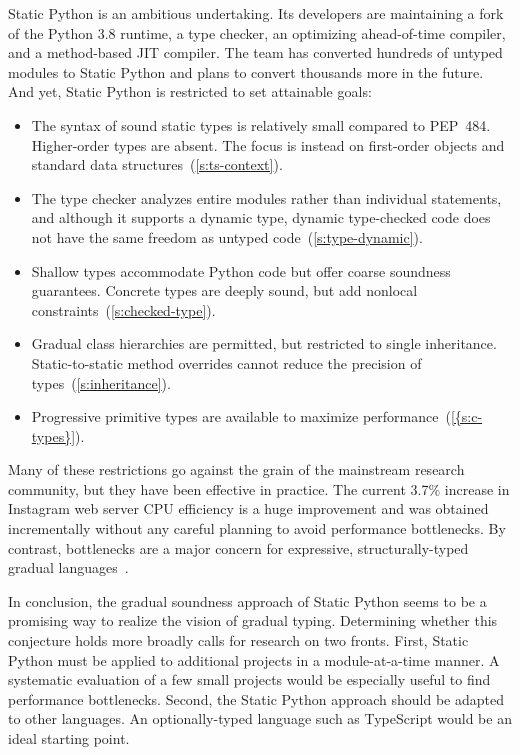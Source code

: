 \documentclass[english,cleveref,submission]{programming}
\newcommand{\SP}{Static Python}
\newcommand{\PEP}{PEP~484}
\newcommand{\CPUchange}{3.7\%}
\begin{document}
\SP{} is an ambitious undertaking.
Its developers are maintaining a fork of the Python 3.8 runtime,
a type checker,
an optimizing ahead-of-time compiler,
and a method-based JIT compiler.
The team has converted hundreds of untyped modules to \SP{}
and plans to convert thousands more in the future.
And yet, \SP{} is restricted to set attainable goals:
\begin{itemize}
  \item
    The syntax of sound static types is relatively small compared
    to \PEP{}.
    Higher-order types are absent.
    The focus is instead on first-order objects and standard data structures~(\cref{s:ts-context}).
  \item
    The type checker analyzes entire modules rather than individual statements,
    and although it supports a dynamic type, dynamic type-checked code
    does not have the same freedom as untyped code~(\cref{s:type-dynamic}).
  \item
    Shallow types accommodate Python code but offer coarse
    soundness guarantees.
    Concrete types are deeply sound, but add nonlocal constraints~(\cref{s:checked-type}).
  \item
    Gradual class hierarchies are permitted, but restricted to single inheritance.
    Static-to-static method overrides cannot reduce the precision of types~(\cref{s:inheritance}).
  \item
    Progressive primitive types are available to maximize performance~(\cref{{s:c-types}}).
\end{itemize}
%
Many of these restrictions go against the grain of the mainstream
research community, but they have been effective in practice.
The current \CPUchange{} increase in Instagram web server CPU efficiency is a huge improvement
and was obtained incrementally without any careful planning to avoid performance bottlenecks.
By contrast, bottlenecks are a major concern for expressive, structurally-typed
gradual languages~\cite{gtnffvf-jfp-2019,tfgnvf-popl-2016}.

In conclusion, the gradual soundness approach of \SP{} seems to be a promising
way to realize the vision of gradual typing.
Determining whether this conjecture holds more broadly
calls for research on two fronts.
First, \SP{} must be applied to additional projects in a module-at-a-time manner.
A systematic evaluation of a few small projects would be
especially useful to find performance bottlenecks.
Second, the \SP{} approach should be adapted to other languages.
An optionally-typed language such as TypeScript would be an ideal starting
point.
\end{document}
